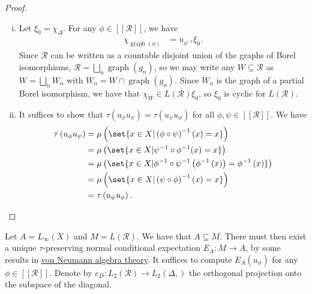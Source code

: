 \documentclass[10pt]{mypackage}
\begin{document}
\begin{proof}\hfill
  \begin{enumerate}[(i)]
    \item Let $\xi_0 = \chi_{\Delta}$. For any $\phi\in \left[ \left[ \mathcal{R} \right] \right]$, we have
      \begin{align*}
        \chi_{\operatorname{graph}\left( \phi \right)} &= u_{\phi^{-1}}\xi_0.
      \end{align*}
      Since $\mathcal{R}$ can be written as a countable disjoint union of the graphs of Borel isomorphisms, $\mathcal{R} = \bigsqcup_{n}\operatorname{graph}\left( g_n \right)$, so we may write any $W\subseteq \mathcal{R}$ as $W = \bigsqcup_{n}W_n$ with $W_n = W\cap \operatorname{graph}\left( g_n \right)$. Since $W_n$ is the graph of a partial Borel isomorphism, we have that $\chi_W\in \overline{L\left( \mathcal{R} \right)\xi_0}$, so $\xi_0$ is cyclic for $L\left( \mathcal{R} \right)$.
    \item It suffices to show that $\tau\left( u_{\phi}u_{\psi} \right) = \tau\left( u_{\psi}u_{\phi} \right)$ for all $\phi,\psi\in \left[ \left[ \mathcal{R} \right] \right]$. We have
      \begin{align*}
        \tau\left( u_{\phi}u_{\psi} \right) &= \mu\left( \set{x\in X | \left( \phi\circ\psi \right)^{-1}(x) = x} \right)\\
                                            &= \mu\left( \set{x\in X | \psi^{-1}\circ\phi^{-1}(x) = x} \right)\\
                                            &= \mu\left( \set{x\in X | \phi^{-1}\circ\psi^{-1}\left( \phi^{-1}\left( x \right) \right) = \phi^{-1}\left( x \right)} \right)\\
                                            &= \mu\left( \set{x\in X | \left( \psi\circ\phi \right)^{-1}\left( x \right) = x} \right)\\
                                            &= \tau\left( u_{\psi}u_{\phi} \right).
      \end{align*}
  \end{enumerate}
\end{proof}
Let $A = L_{\infty}\left( X \right)$ and $M = L\left( \mathcal{R} \right)$. We have that $A\subseteq M$. There must then exist a unique $\tau$-preserving normal conditional expectation $E_A\colon M\rightarrow A$, by some results in \href{https://ai.avinash-iyer.com/Classes_and_Homework/After\%20College/Other\%20Notes/vna_projections.pdf}{von Neumann algebra theory}. It suffices to compute $E_A\left( u_{\phi} \right)$ for any $\phi\in \left[ \left[ \mathcal{R} \right] \right]$. Denote by $e_D\colon L_2\left( \mathcal{R} \right)\rightarrow L_2\left( \Delta, \right)$ the orthogonal projection onto the subspace of the diagonal.
\end{document}
